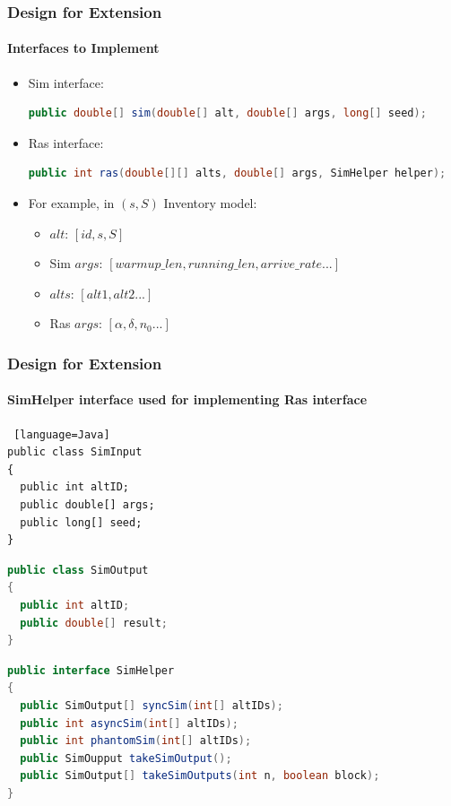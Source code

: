 \documentclass{beamer}
\begin{document}
\begin{frame}[fragile]
\frametitle{Design for Extension}
\framesubtitle{Interfaces to Implement}
\begin{itemize}
\item Sim interface:
\begin{lstlisting}[language=Java]
public double[] sim(double[] alt, double[] args, long[] seed);
\end{lstlisting}
\item Ras interface:
\begin{lstlisting}[language=Java]
public int ras(double[][] alts, double[] args, SimHelper helper);
\end{lstlisting}
\item For example, in $(s, S)$ Inventory model:
\begin{itemize}
\item $alt$: $[id, s, S]$
\item Sim $args$: $[warmup\_len, running\_len, arrive\_rate...]$
\item $alts$: $[alt1, alt2...]$
\item Ras $args$: $[\alpha, \delta, n_0...]$
\end{itemize}
\end{itemize}
\end{frame}

\begin{frame}[fragile]
\frametitle{Design for Extension}
\framesubtitle{SimHelper interface used for implementing Ras interface}
\begin{lstlisting} [language=Java]
public class SimInput
{
  public int altID;
  public double[] args;
  public long[] seed;
}
\end{lstlisting}
\begin{lstlisting}[language=Java]
public class SimOutput
{
  public int altID;
  public double[] result;
}
\end{lstlisting}
\begin{lstlisting}[language=Java]
public interface SimHelper
{
  public SimOutput[] syncSim(int[] altIDs);
  public int asyncSim(int[] altIDs);
  public int phantomSim(int[] altIDs);
  public SimOupput takeSimOutput();
  public SimOutput[] takeSimOutputs(int n, boolean block);
}
\end{lstlisting}
\end{frame}
\end{document}

